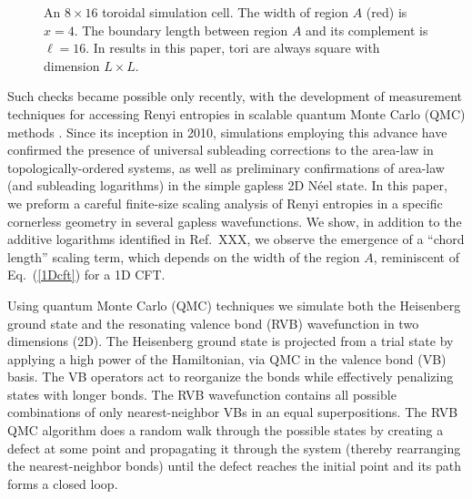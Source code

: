 \documentclass[prl,aps,twocolumn,floatfix,amsmath,amssymb,superscriptaddress,tightenlines]{revtex4}
\begin{document}
 \begin{figure}[ht]
   \begin{center}
   \end{center}
   \caption{An $8 \times 16$ toroidal simulation cell.  The width of region $A$ (red) is $x=4$.  The boundary length between region $A$ and its complement is $\ell = 16$.  In results in this paper, tori are always square with dimension $L \times L$. }
   \label{fig:torus}
 \end{figure}

Such checks became possible only recently, with the development of measurement techniques for accessing Renyi entropies in scalable quantum Monte Carlo (QMC) methods \cite{swap}.  Since its inception in 2010, simulations employing this advance have confirmed the presence of universal subleading corrections to the area-law in topologically-ordered systems, as well as preliminary confirmations of area-law (and subleading logarithms) in the simple gapless 2D N\'eel state.  In this paper, we preform a careful finite-size scaling analysis of Renyi entropies in a specific cornerless geometry in several gapless wavefunctions.  We show, in addition to the additive logarithms identified in Ref.~XXX, we observe the emergence of a ``chord length'' scaling term, which depends on the width of the region $A$, reminiscent of Eq.~(\ref{1Dcft}) for a 1D CFT.

Using quantum Monte Carlo (QMC) techniques we simulate both the Heisenberg ground state and the resonating valence bond (RVB) wavefunction in two dimensions (2D). 
The Heisenberg ground state is projected from a trial state by applying a high power of the Hamiltonian, via QMC in the valence bond (VB) basis.\cite{Sandvik_VBQMC}
The VB operators act to reorganize the bonds while effectively penalizing states with longer bonds.
The RVB wavefunction contains all possible combinations of only nearest-neighbor VBs in an equal superpositions.
The RVB QMC algorithm does a random walk through the possible states by creating a defect at some point and propagating it through the system (thereby rearranging the nearest-neighbor bonds) until the defect reaches the initial point and its path forms a closed loop.
\end{document}
